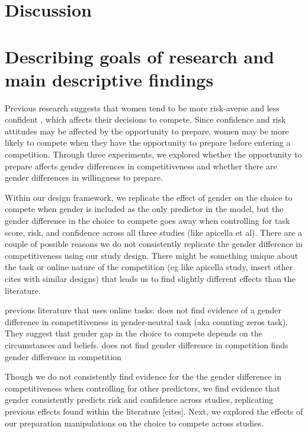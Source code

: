 \documentclass[a4paper, nobind]{templates/ociamthesis}
\begin{document}
\hypertarget{discussion}{%
\section{Discussion}\label{discussion}}

\hypertarget{describing-goals-of-research-and-main-descriptive-findings}{%
\section{Describing goals of research and main descriptive findings}\label{describing-goals-of-research-and-main-descriptive-findings}}

Previous research suggests that women tend to be more risk-averse \autocite{Croson2009,Dohmen2011b,Eckel2008,Bertrand2010a} and less confident \autocite{Bertrand2010,Lundeberg1994,Mobius2011,Barber2001,Croson2009}, which affects their decisions to compete. Since confidence and risk attitudes may be affected by the opportunity to prepare, women may be more likely to compete when they have the opportunity to prepare before entering a competition. Through three experiments, we explored whether the opportunity to prepare affects gender differences in competitiveness and whether there are gender differences in willingness to prepare.

Within our design framework, we replicate the effect of gender on the choice to compete when gender is included as the only predictor in the model, but the gender difference in the choice to compete goes away when controlling for task score, risk, and confidence across all three studies (like apicella et al). There are a couple of possible reasons we do not consistently replicate the gender difference in competitiveness using our study design. There might be something unique about the task or online nature of the competition (eg like apicella study, insert other cites with similar designs) that leads us to find slightly different effects than the literature.

previous literature that uses online tasks:
\textcite{Charness2021} does not find evidence of a gender difference in competitiveness in gender-neutral task (aka counting zeros task). They suggest that gender gap in the choice to compete depends on the circumstances and beliefs.
\textcite{Apicella2020} does not find gender difference in competition
\textcite{Apicella2017} finds gender difference in competition

Though we do not consistently find evidence for the the gender difference in competitiveness when controlling for other predictors, we find evidence that gender consistently predicts risk and confidence across studies, replicating previous effects found within the literature {[}cites{]}. Next, we explored the effects of our preparation manipulations on the choice to compete across studies.
\end{document}
